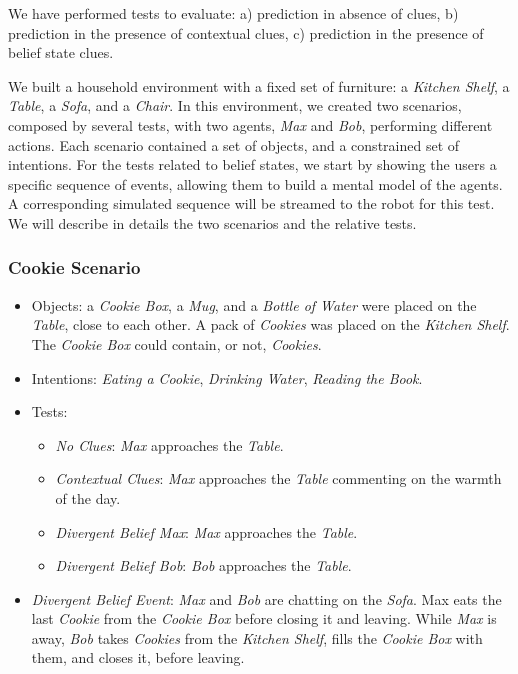 We have performed tests to evaluate: a) prediction in absence of clues, b) prediction in the presence of contextual clues, c) prediction in the presence of belief state clues.

We built a household environment with a fixed set of furniture: a \textit{Kitchen Shelf}, a \textit{Table}, a \textit{Sofa}, and a \textit{Chair}. In this environment, we created two scenarios, composed by several tests, with two agents, \textit{Max} and \textit{Bob}, performing different actions. Each scenario contained a set of objects, and a constrained set of intentions. For the tests related to belief states, we start by showing the users a specific sequence of events, allowing them to build a mental model of the agents. A corresponding simulated sequence will be streamed to the robot for this test.
We will describe in details the two scenarios and the relative tests.

\subsubsection{Cookie Scenario}
\begin{itemize}
\item Objects: a \textit{Cookie Box}, a \textit{Mug}, and a \textit{Bottle of Water} were placed on the \textit{Table}, close to each other. A pack of \textit{Cookies} was placed on the \textit{Kitchen Shelf}. The \textit{Cookie Box} could contain, or not, \textit{Cookies}.
\item Intentions: \textit{Eating a Cookie}, \textit{Drinking Water}, \textit{Reading the Book}.
\item Tests:
\begin{itemize}
	\item \textit{No Clues}: \textit{Max} approaches the \textit{Table}.
    \item \textit{Contextual Clues}: \textit{Max} approaches the \textit{Table} commenting on the warmth of the day.
	\item \textit{Divergent Belief Max}: \textit{Max} approaches the \textit{Table}.
	\item \textit{Divergent Belief Bob}: \textit{Bob} approaches the \textit{Table}.
\end{itemize}
\item  \textit{Divergent Belief Event}:  \textit{Max} and \textit{Bob} are chatting on the \textit{Sofa}. Max eats the last \textit{Cookie} from the \textit{Cookie Box} before closing it and leaving. While \textit{Max} is away, \textit{Bob} takes \textit{Cookies} from the \textit{Kitchen Shelf}, fills the \textit{Cookie Box} with them, and closes it, before leaving.
\end{itemize}

